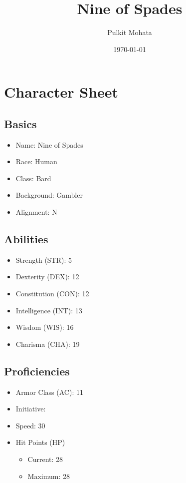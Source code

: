 \documentclass[11pt]{article}
\author{Pulkit Mohata}
\date{\today}
\title{Nine of Spades}
\begin{document}
\maketitle
\tableofcontents

\section{Character Sheet}
\label{sec:org350ca8f}
\subsection{Basics}
\label{sec:org87d1fdf}
\begin{itemize}
\item Name: Nine of Spades
\item Race: Human
\item Class: Bard
\item Background: Gambler
\item Alignment: N
\end{itemize}
\subsection{Abilities}
\label{sec:org173e03b}
\begin{itemize}
\item Strength (STR): 5
\item Dexterity (DEX): 12
\item Constitution (CON): 12
\item Intelligence (INT): 13
\item Wisdom (WIS): 16
\item Charisma (CHA): 19
\end{itemize}
\subsection{Proficiencies}
\label{sec:org9e70fdb}
\begin{itemize}
\item Armor Class (AC): 11
\item Initiative:
\item Speed: 30
\item Hit Points (HP)
\begin{itemize}
\item Current: 28
\item Maximum: 28
\end{itemize}
\end{itemize}
\end{document}

